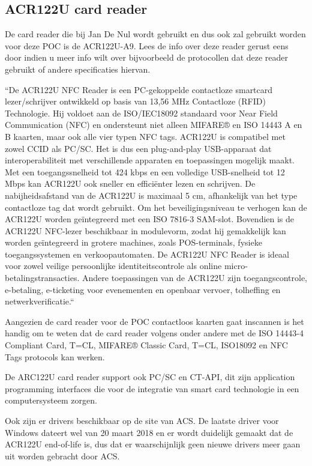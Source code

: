 \subsection{ACR122U card reader}
De card reader die bij Jan De Nul wordt gebruikt en dus ook zal gebruikt worden voor deze POC is de ACR122U-A9. Lees de info over deze reader gerust eens door indien u meer info wilt over bijvoorbeeld de protocollen dat deze reader gebruikt of andere specificaties hiervan.

``De ACR122U NFC Reader is een PC-gekoppelde contactloze smartcard lezer/schrijver ontwikkeld op basis van 13,56 MHz Contactloze (RFID) Technologie. Hij voldoet aan de ISO/IEC18092 standaard voor Near Field Communication (NFC) en ondersteunt niet alleen MIFARE® en ISO 14443 A en B kaarten, maar ook alle vier typen NFC tags.
ACR122U is compatibel met zowel CCID als PC/SC. Het is dus een plug-and-play USB-apparaat dat interoperabiliteit met verschillende apparaten en toepassingen mogelijk maakt. Met een toegangssnelheid tot 424 kbps en een volledige USB-snelheid tot 12 Mbps kan ACR122U ook sneller en efficiënter lezen en schrijven. De nabijheidsafstand van de ACR122U is maximaal 5 cm, afhankelijk van het type contactloze tag dat wordt gebruikt.
Om het beveiligingsniveau te verhogen kan de ACR122U worden geïntegreerd met een ISO 7816-3 SAM-slot. Bovendien is de ACR122U NFC-lezer beschikbaar in modulevorm, zodat hij gemakkelijk kan worden geïntegreerd in grotere machines, zoals POS-terminals, fysieke toegangssystemen en verkoopautomaten.
De ACR122U NFC Reader is ideaal voor zowel veilige persoonlijke identiteitscontrole als online micro-betalingstransacties. Andere toepassingen van de ACR122U zijn toegangscontrole, e-betaling, e-ticketing voor evenementen en openbaar vervoer, tolheffing en netwerkverificatie.``\autocite{ACSACR122U}

Aangezien de card reader voor de POC contactloos kaarten gaat inscannen is het handig om te weten dat de card reader volgens \textcite{ACSACR122U} onder andere met de ISO 14443-4 Compliant Card, T=CL, MIFARE® Classic Card, T=CL, ISO18092 en NFC Tags protocols kan werken.

De ARC122U card reader support ook PC/SC en CT-API, dit zijn application programming interfaces die voor de integratie van smart card technologie in een computersysteem zorgen.

Ook zijn er drivers beschikbaar op de site van ACS. De laatste driver voor Windows dateert wel van 20 maart 2018 en er wordt duidelijk gemaakt dat de ACR122U end-of-life is, dus dat er waarschijnlijk geen nieuwe drivers meer gaan uit worden gebracht door ACS.




